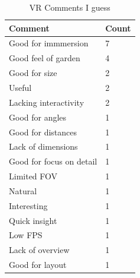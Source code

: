 \begin{table}[H]
	\centering
	\caption{VR Comments I guess}
	\label{my-label}
	\begin{tabular}{p{5cm}|p{1cm}}
		Comment & Count \\ \hline
		Good for immmersion & 7 \\
		Good feel of garden & 4 \\
		Good for size  & 2 \\
		Useful & 2 \\
		Lacking interactivity & 2 \\
		Good for angles & 1 \\
		Good for distances& 1 \\
		Lack of dimensions& 1 \\
		Good for focus on detail& 1 \\
		Limited FOV& 1 \\
		Natural& 1 \\
		Interesting& 1 \\
		Quick insight& 1 \\
		Low FPS& 1 \\
		Lack of overview& 1 \\
		Good for layout& 1 \\
		
	\end{tabular}

\end{table}

